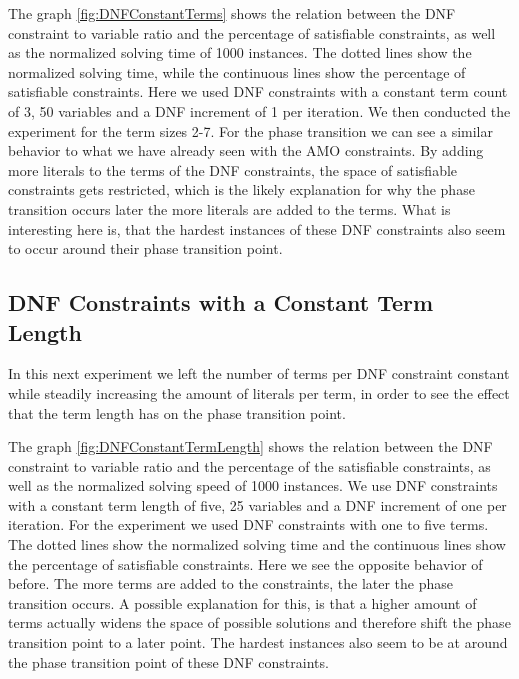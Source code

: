 


The graph \ref{fig:DNFConstantTerms} shows the relation between the DNF constraint to variable ratio and the percentage of satisfiable constraints, as well as the normalized solving time of 1000 instances. The dotted lines show the normalized solving time, while the continuous lines show the percentage of satisfiable constraints. Here we used DNF constraints with a constant term count of 3, 50 variables and a DNF increment of 1 per iteration. We then conducted the experiment for the term sizes 2-7. For the phase transition we can see a similar behavior to what we have already seen with the AMO constraints. By adding more literals to the terms of the DNF constraints, the space of satisfiable constraints gets restricted, which is the likely explanation for why the phase transition occurs later the more literals are added to the terms. What is interesting here is, that the hardest instances of these DNF constraints also seem to occur around their phase transition point.

\subsection{DNF Constraints with a Constant Term Length}

In this next experiment we left the number of terms per DNF constraint constant while steadily increasing the amount of literals per term, in order to see the effect that the term length has on the phase transition point.

	

The graph \ref{fig:DNFConstantTermLength} shows the relation between the DNF constraint to variable ratio and the percentage of the satisfiable constraints, as well as the normalized solving speed of 1000 instances. We use DNF constraints with a constant term length of five, 25 variables and a DNF increment of one per iteration. For the experiment we used DNF constraints with one to five terms. The dotted lines show the normalized solving time and the continuous lines show the percentage of satisfiable constraints. Here we see the opposite behavior of before. The more terms are added to the constraints, the later the phase transition occurs. A possible explanation for this, is that a higher amount of terms actually widens the space of possible solutions and therefore shift the phase transition point to a later point. The hardest instances also seem to be at around the phase transition point of these DNF constraints.

